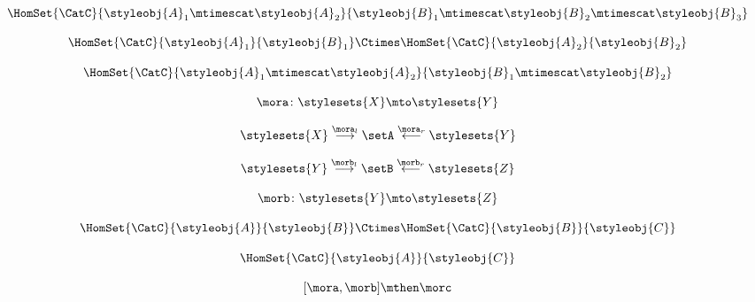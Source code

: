 {\begin{forslides}
        \begin{equation}
            \label{eq:slides_multicategories_73}
            \HomSet{\CatC}{\styleobj{A}_1 \mtimescat \styleobj{A}_2}{\styleobj{B}_1 \mtimescat \styleobj{B}_2 \mtimescat \styleobj{B}_3}
        \end{equation}

        \begin{equation}
            \label{eq:slides_multicategories_74}
            \HomSet{\CatC}{\styleobj{A}_1}{\styleobj{B}_1} \Ctimes \HomSet{\CatC}{\styleobj{A}_2}{\styleobj{B}_2}
        \end{equation}

        \begin{equation}
            \label{eq:slides_multicategories_75}
            \HomSet{\CatC}{\styleobj{A}_1 \mtimescat \styleobj{A}_2}{\styleobj{B}_1 \mtimescat \styleobj{B}_2}
        \end{equation}

        \begin{equation}
            \label{eq:slides_multicategories_76}
            \mora \colon \stylesets{X}  \mto \stylesets{Y}
        \end{equation}

        \begin{equation}
            \label{eq:slides_multicategories_77}
            \stylesets{X} \overset{\mora_l}{\longrightarrow} \setA \overset{\mora_r}{\longleftarrow} \stylesets{Y}
        \end{equation}

        \begin{equation}
            \label{eq:slides_multicategories_78}
            \stylesets{Y} \overset{\morb_l}{\longrightarrow} \setB \overset{\morb_r}{\longleftarrow} \stylesets{Z}
        \end{equation}

        \begin{equation}
            \label{eq:slides_multicategories_79}
            \morb \colon \stylesets{Y}  \mto \stylesets{Z}
        \end{equation}

        \begin{equation}
            \label{eq:slides_multicategories_80}
            \HomSet{\CatC}{\styleobj{A}}{\styleobj{B}} \Ctimes \HomSet{\CatC}{\styleobj{B}}{\styleobj{C}}
        \end{equation}

        \begin{equation}
            \label{eq:slides_multicategories_81}
            \HomSet{\CatC}{\styleobj{A}}{\styleobj{C}}
        \end{equation}

        \begin{equation}
            \label{eq:composition_operad}
            [\mora,\morb]\mthen \morc
        \end{equation}

    \end{forslides}

}